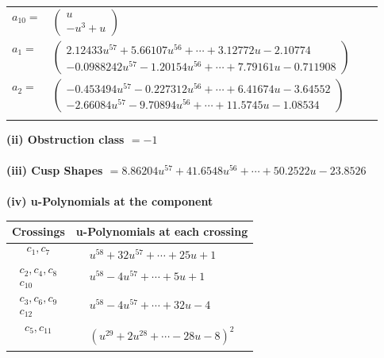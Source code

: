 \documentclass[1p]{elsarticle_modified}
\theoremstyle{definition}
\begin{document}
\begin{tabular}{m{7pt} m{180pt} m{7pt} m{180pt} }
\flushright $a_{10}=$&$\begin{pmatrix}u\\- u^3+u\end{pmatrix}$ \\
\flushright $a_{1}=$&$\begin{pmatrix}2.12433 u^{57}+5.66107 u^{56}+\cdots+3.12772 u-2.10774\\-0.0988242 u^{57}-1.20154 u^{56}+\cdots+7.79161 u-0.711908\end{pmatrix}$ \\
\flushright $a_{2}=$&$\begin{pmatrix}-0.453494 u^{57}-0.227312 u^{56}+\cdots+6.41674 u-3.64552\\-2.66084 u^{57}-9.70894 u^{56}+\cdots+11.5745 u-1.08534\end{pmatrix}$\\&\end{tabular}
\flushleft \textbf{(ii) Obstruction class $= -1$}\\~\\
\flushleft \textbf{(iii) Cusp Shapes $= 8.86204 u^{57}+41.6548 u^{56}+\cdots+50.2522 u-23.8526$}\\~\\
\newpage\renewcommand{\arraystretch}{1}
\flushleft \textbf{(iv) u-Polynomials at the component}\newline \\
\begin{tabular}{m{50pt}|m{274pt}}
Crossings & \hspace{64pt}u-Polynomials at each crossing \\
\hline $$\begin{aligned}c_{1},c_{7}\end{aligned}$$&$\begin{aligned}
&u^{58}+32 u^{57}+\cdots+25 u+1
\end{aligned}$\\
\hline $$\begin{aligned}c_{2},c_{4},c_{8}\\c_{10}\end{aligned}$$&$\begin{aligned}
&u^{58}-4 u^{57}+\cdots+5 u+1
\end{aligned}$\\
\hline $$\begin{aligned}c_{3},c_{6},c_{9}\\c_{12}\end{aligned}$$&$\begin{aligned}
&u^{58}-4 u^{57}+\cdots+32 u-4
\end{aligned}$\\
\hline $$\begin{aligned}c_{5},c_{11}\end{aligned}$$&$\begin{aligned}
&(u^{29}+2 u^{28}+\cdots-28 u-8)^{2}
\end{aligned}$\\
\hline
\end{tabular}\\~\\
\end{document}
